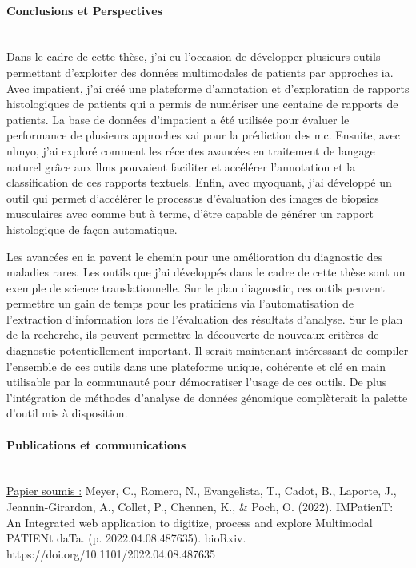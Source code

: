\paragraph{\textbf{Conclusions et Perspectives}}\mbox{}\\

Dans le cadre de cette thèse, j’ai eu l’occasion de développer plusieurs outils permettant d’exploiter des données multimodales de patients par approches \gls{ia}. Avec \gls{impatient}, j’ai créé une plateforme d’annotation et d’exploration de rapports histologiques de patients qui a permis de numériser une centaine de rapports de patients. La base de données d’\gls{impatient} a été utilisée pour évaluer le performance de plusieurs approches \gls{xai} pour la prédiction des \gls{mc}. Ensuite, avec \gls{nlmyo}, j’ai exploré comment les récentes avancées en traitement de langage naturel grâce aux \gls{llms} pouvaient faciliter et accélérer l’annotation et la classification de ces rapports textuels. Enfin, avec \gls{myoquant}, j’ai développé un outil qui permet d’accélérer le processus d’évaluation des images de biopsies musculaires avec comme but à terme, d’être capable de générer un rapport histologique de façon automatique.

Les avancées en \gls{ia} pavent le chemin pour une amélioration du diagnostic des maladies rares. Les outils que j’ai développés dans le cadre de cette thèse sont un exemple de science translationnelle. Sur le plan diagnostic, ces outils peuvent permettre un gain de temps pour les praticiens via l’automatisation de l’extraction d’information lors de l’évaluation des résultats d’analyse. Sur le plan de la recherche, ils peuvent permettre la découverte de nouveaux critères de diagnostic potentiellement important. Il serait maintenant intéressant de compiler l’ensemble de ces outils dans une plateforme unique, cohérente et clé en main utilisable par la communauté pour démocratiser l’usage de ces outils. De plus l’intégration de méthodes d’analyse de données génomique complèterait la palette d’outil mis à disposition.


\paragraph{\textbf{Publications et communications}}\mbox{}\\

\underline{Papier soumis :} Meyer, C., Romero, N., Evangelista, T., Cadot, B., Laporte, J., Jeannin-Girardon, A., Collet, P., Chennen, K., \& Poch, O. (2022). IMPatienT: An Integrated web application to digitize, process and explore Multimodal PATIENt daTa. (p. 2022.04.08.487635). bioRxiv. https://doi.org/10.1101/2022.04.08.487635

